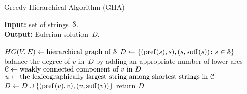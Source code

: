 \begin{algorithm}[!ht]
\caption{Greedy Hierarchical Algorithm (GHA)}\label{algo:gha}
\hspace*{\algorithmicindent} \textbf{Input:} set of strings~${\cal S}$.\\
\hspace*{\algorithmicindent} \textbf{Output:} Eulerian solution~$D$.
\begin{algorithmic}[1]
\State $HG(V,E) \gets \text{hierarchical graph of ${\cal S}$}$ 
\State\label{alg:gha_init} $D \gets \{(\operatorname{pref}(s), s), (s, \operatorname{suff}(s)) \colon s \in {\cal S}\}$
\label{alg:for}
\State\label{alg:step6} balance the degree of $v$ in~$D$ by adding an appropriate number of lower arcs
\Else
\State\label{alg:else} ${\cal C} \gets \text{weakly connected component of $v$ in $D$}$
\State $u \gets \text{the lexicographically largest string among shortest strings in ${\cal C}$}$
\State\label{alg:last} $D \gets D \cup \{(\operatorname{pref}(v), v), (v, \operatorname{suff}(v))\}$
\EndIf
\EndIf
\EndFor
\EndFor
\State return $D$
\end{algorithmic}
\end{algorithm}

